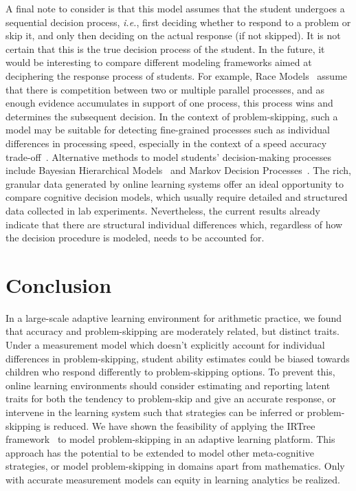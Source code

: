 \documentclass[12pt]{article}
\begin{document}
A final note to consider is that this model assumes that the student undergoes a sequential decision process, \textit{i.e.}, first deciding whether to respond to a problem or skip it, and only then deciding on the actual response (if not skipped). It is not certain that this is the true decision process of the student. In the future, it would be interesting to compare different modeling frameworks aimed at deciphering the response process of students. For example, Race Models~\parencite{heathcote2022winner} assume that there is competition between two or multiple parallel processes, and as enough evidence accumulates in support of one process, this process wins and determines the subsequent decision. In the context of problem-skipping, such a model may be suitable for detecting fine-grained processes such as individual differences in processing speed, especially in the context of a speed accuracy trade-off~\parencite{heathcote2022winner, evans2018modeling}. Alternative methods to model students' decision-making processes include Bayesian Hierarchical Models~\parencite{sawyer2018modeling, lee2014bayesian} and Markov Decision Processes~\parencite{lamar2018markov, puterman1994markov}. The rich, granular data generated by online learning systems offer an ideal opportunity to compare cognitive decision models, which usually require detailed and structured data collected in lab experiments. Nevertheless, the current results already indicate that there are structural individual differences which, regardless of how the decision procedure is modeled, needs to be accounted for.

\section{Conclusion}
In a large-scale adaptive learning environment for arithmetic practice, we found that accuracy and problem-skipping are moderately related, but distinct traits. Under a measurement model which doesn't explicitly account for individual differences in problem-skipping, student ability estimates could be biased towards children who respond differently to problem-skipping options. To prevent this, online learning environments should consider estimating and reporting latent traits for both the tendency to problem-skip and give an accurate response, or intervene in the learning system such that strategies can be inferred or problem-skipping is reduced. We have shown the feasibility of applying the IRTree framework~\parencite{de2012irtrees} to model problem-skipping in an adaptive learning platform. This approach has the potential to be extended to model other meta-cognitive strategies, or model problem-skipping in domains apart from mathematics. Only with accurate measurement models can equity in learning analytics be realized. 
\end{document}
